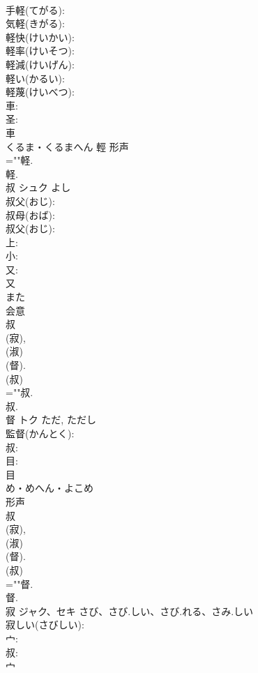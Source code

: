 \documentclass[8pt]{extreport}
\begin{document}
\begin{CJK}{UTF8}{min}
\\	手軽(てがる): 
\\	気軽(きがる): 
\\	軽快(けいかい): 
\\	軽率(けいそつ): 
\\	軽減(けいげん): 
\\	軽い(かるい): 
\\	軽蔑(けいべつ): 
\\	車: 
\\	圣: 
\\	車	
\\	くるま・くるまへん	輕	形声 
\\	=""軽.
\\	軽.
\\	叔	シュク		よし	
\\	叔父(おじ): 
\\	叔母(おば): 
\\	叔父(おじ): 
\\	上: 
\\	小: 
\\	又: 
\\	又	
\\	また	
\\	会意 
\\	叔 
\\	(寂), 
\\	(淑) 
\\	(督). 
\\	(叔) 
\\	=""叔.
\\	叔.
\\	督	トク		ただ, ただし	
\\	監督(かんとく): 
\\	叔: 
\\	目: 
\\	目	
\\	め・めへん・よこめ	
\\	形声 
\\	叔 
\\	(寂), 
\\	(淑) 
\\	(督). 
\\	(叔) 
\\	=""督.
\\	督.
\\	寂	ジャク、セキ	さび、さび.しい、さび.れる、さみ.しい		
\\	寂しい(さびしい): 
\\	宀: 
\\	叔: 
\\	宀	

\end{CJK}
\end{document}
